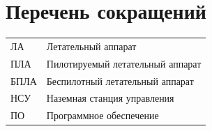 \documentclass[specification,annotation]{itmo-student-thesis}
\begin{document}
\chapter{Перечень сокращений}\label{sec:app:1}

\begin{table}[!h]
  \centering
  \begin{tabularx}{\textwidth}{L{0.5} L{1.5}}
    \hline
    ЛА & Летательный аппарат \\
    ПЛА & Пилотируемый летательный аппарат \\
    БПЛА & Беспилотный летательный аппарат \\
    НСУ & Наземная станция управления \\
    ПО & Программное обеспечение \\
    \hline
  \end{tabularx}
\end{table}
\end{document}
